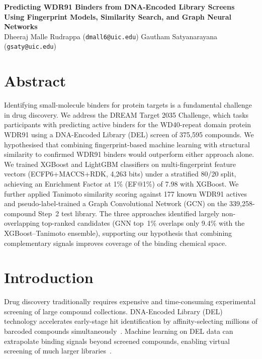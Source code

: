 \documentclass[10pt, letterpaper]{article}
\begin{document}
\begin{center}
{\large \textbf{Predicting WDR91 Binders from DNA-Encoded Library Screens\\
Using Fingerprint Models, Similarity Search, and Graph Neural Networks}}\\[8pt]
Dheeraj Malle Rudrappa (\texttt{dmall6@uic.edu}) \quad
Gautham Satyanarayana (\texttt{gsaty@uic.edu})
\end{center}

\section*{Abstract}
Identifying small-molecule binders for protein targets is a fundamental challenge in drug discovery. We address the DREAM Target 2035 Challenge, which tasks participants with predicting active binders for the WD40-repeat domain protein WDR91 using a DNA-Encoded Library (DEL) screen of 375,595 compounds. We hypothesised that combining fingerprint-based machine learning with structural similarity to confirmed WDR91 binders would outperform either approach alone. We trained XGBoost and LightGBM classifiers on multi-fingerprint feature vectors (ECFP6+MACCS+RDK, 4,263 bits) under a stratified 80/20 split, achieving an Enrichment Factor at 1\% (EF@1\%) of 7.98 with XGBoost. We further applied Tanimoto similarity scoring against 177 known WDR91 actives and pseudo-label-trained a Graph Convolutional Network (GCN) on the 339,258-compound Step~2 test library. The three approaches identified largely non-overlapping top-ranked candidates (GNN top~1\% overlaps only 9.4\% with the XGBoost--Tanimoto ensemble), supporting our hypothesis that combining complementary signals improves coverage of the binding chemical space.

\section{Introduction}
Drug discovery traditionally requires expensive and time-consuming experimental screening of large compound collections. DNA-Encoded Library (DEL) technology accelerates early-stage hit identification by affinity-selecting millions of barcoded compounds simultaneously~\cite{Goodnow2017}. Machine learning on DEL data can extrapolate binding signals beyond screened compounds, enabling virtual screening of much larger libraries~\cite{McCloskey2020}.
\end{document}

